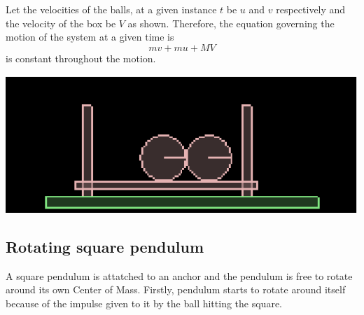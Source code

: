 \documentclass[11pt]{article}%
\begin{document}
Let the velocities of the balls, at a given instance $t$ be $u$ and $v$ respectively and the velocity of the box be $V$ as shown. Therefore, the equation governing the motion of the system at a given time is\begin{equation}mv+mu+MV\end{equation} is constant throughout the motion.
\vskip 0.5in
\centerline{\includegraphics[scale=1.1]{dubdubexec}}
\vskip 0.3in
\subsection{Rotating square pendulum}
A square pendulum is attatched to an anchor and the pendulum is free to rotate around its own Center of Mass. Firstly, pendulum starts to rotate around itself because of the impulse given to it by the ball hitting the square.
\end{document}
